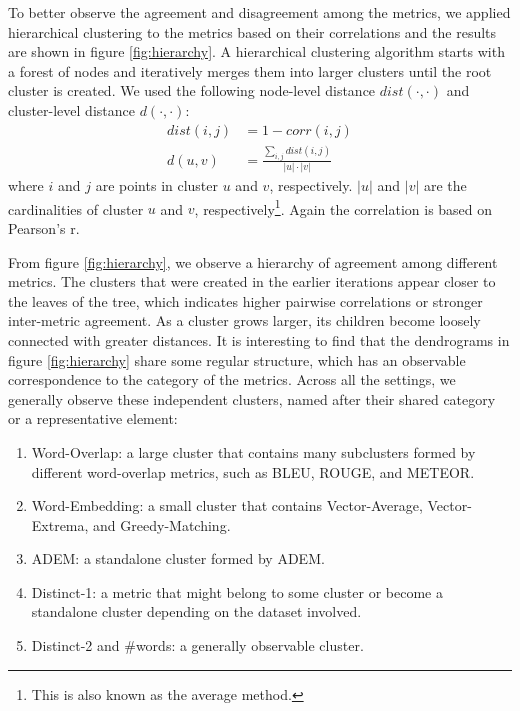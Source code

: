 \documentclass[runningheads]{llncs}
\begin{document}
    To better observe the agreement and disagreement among the metrics, we applied hierarchical clustering to the metrics based on their correlations and the results are shown in figure \ref{fig:hierarchy}. A hierarchical clustering algorithm starts with a forest of nodes and iteratively merges them into larger clusters until the root cluster is created. We used the following node-level distance $\textit{dist}(\cdot, \cdot)$ and cluster-level distance $d(\cdot, \cdot)$:
    \begin{align}
        \textit{dist}(i, j) &= 1 - \textit{corr}(i, j) \\
        d(u, v) &= \frac{\sum_{i,j}\textit{dist}(i, j)}{|u| \cdot |v|}
    \end{align}
    where $i$ and $j$ are points in cluster $u$ and $v$, respectively. $|u|$ and $|v|$ are the cardinalities of cluster $u$ and $v$, respectively\footnote{This is also known as the average method.}. Again the correlation is based on Pearson's r.
    

    From figure \ref{fig:hierarchy}, we observe a hierarchy of agreement among different metrics. The clusters that were created in the earlier iterations appear closer to the leaves of the tree, which indicates higher pairwise correlations or stronger inter-metric agreement. As a cluster grows larger, its children become loosely connected with greater distances. It is interesting to find that the dendrograms in figure \ref{fig:hierarchy} share some regular structure, which has an observable correspondence to the category of the metrics. Across all the settings, we generally observe these independent clusters, named after their shared category or a representative element:
    \begin{enumerate}
        \item Word-Overlap: a large cluster that contains many subclusters formed by different word-overlap metrics, such as BLEU, ROUGE, and METEOR.
        \item Word-Embedding: a small cluster that contains Vector-Average, Vector-Extrema, and Greedy-Matching.
        \item ADEM: a standalone cluster formed by ADEM.
        \item Distinct-1: a metric that might belong to some cluster or become a standalone cluster depending on the dataset involved.
        \item Distinct-2 and \#words: a generally observable cluster.
    \end{enumerate}
\end{document}

